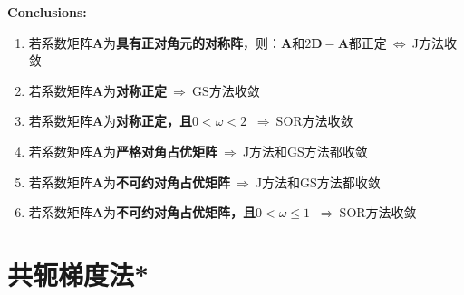\textbf{Conclusions:}
\begin{enumerate}
    \item 若系数矩阵$\boldsymbol{A}$为\textbf{具有正对角元的对称阵}，则：$\boldsymbol{A}$和$2\boldsymbol{D}-\boldsymbol{A}$都正定$\ \Leftrightarrow\ $J方法收敛
    \item 若系数矩阵$\boldsymbol{A}$为\textbf{对称正定}$\ \Rightarrow\ $GS方法收敛
    \item 若系数矩阵$\boldsymbol{A}$为\textbf{对称正定，且$0<\omega<2$} $\ \Rightarrow\ $SOR方法收敛
    \item 若系数矩阵$\boldsymbol{A}$为\textbf{严格对角占优矩阵}$\ \Rightarrow\ $J方法和GS方法都收敛
    \item 若系数矩阵$\boldsymbol{A}$为\textbf{不可约对角占优矩阵}$\ \Rightarrow\ $J方法和GS方法都收敛
    \item 若系数矩阵$\boldsymbol{A}$为\textbf{不可约对角占优矩阵，且$0<\omega\leqslant 1$} $\ \Rightarrow\ $SOR方法收敛
\end{enumerate}


\newpage
\section{共轭梯度法*}


% 